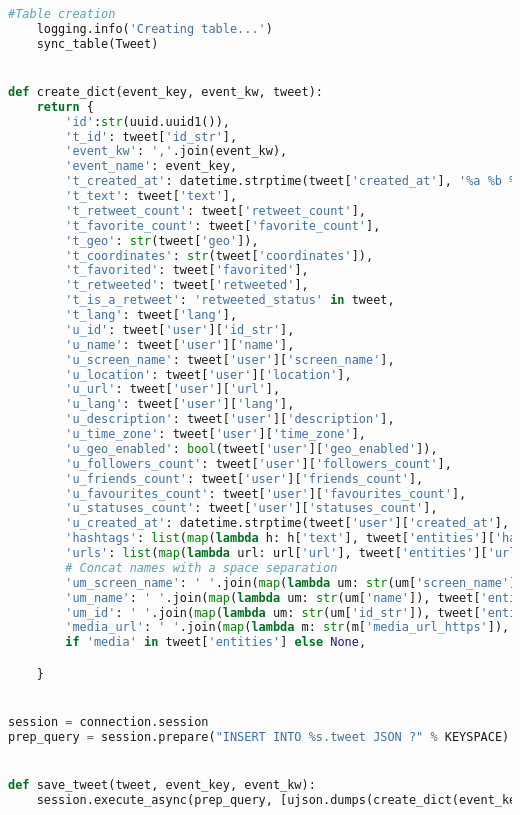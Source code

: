 \begin{lstlisting}[language=Python]
    #Table creation
    logging.info('Creating table...')
    sync_table(Tweet)


def create_dict(event_key, event_kw, tweet):
    return {
        'id':str(uuid.uuid1()),
        't_id': tweet['id_str'],
        'event_kw': ','.join(event_kw),
        'event_name': event_key,
        't_created_at': datetime.strptime(tweet['created_at'], '%a %b %d %H:%M:%S +0000 %Y').isoformat(),
        't_text': tweet['text'],
        't_retweet_count': tweet['retweet_count'],
        't_favorite_count': tweet['favorite_count'],
        't_geo': str(tweet['geo']),
        't_coordinates': str(tweet['coordinates']),
        't_favorited': tweet['favorited'],
        't_retweeted': tweet['retweeted'],
        't_is_a_retweet': 'retweeted_status' in tweet,
        't_lang': tweet['lang'],
        'u_id': tweet['user']['id_str'],
        'u_name': tweet['user']['name'],
        'u_screen_name': tweet['user']['screen_name'],
        'u_location': tweet['user']['location'],
        'u_url': tweet['user']['url'],
        'u_lang': tweet['user']['lang'],
        'u_description': tweet['user']['description'],
        'u_time_zone': tweet['user']['time_zone'],
        'u_geo_enabled': bool(tweet['user']['geo_enabled']),
        'u_followers_count': tweet['user']['followers_count'],
        'u_friends_count': tweet['user']['friends_count'],
        'u_favourites_count': tweet['user']['favourites_count'],
        'u_statuses_count': tweet['user']['statuses_count'],
        'u_created_at': datetime.strptime(tweet['user']['created_at'], '%a %b %d %H:%M:%S +0000 %Y').isoformat(),
        'hashtags': list(map(lambda h: h['text'], tweet['entities']['hashtags'])),
        'urls': list(map(lambda url: url['url'], tweet['entities']['urls'])),
        # Concat names with a space separation
        'um_screen_name': ' '.join(map(lambda um: str(um['screen_name']), tweet['entities']['user_mentions'])),
        'um_name': ' '.join(map(lambda um: str(um['name']), tweet['entities']['user_mentions'])),
        'um_id': ' '.join(map(lambda um: str(um['id_str']), tweet['entities']['user_mentions'])),
        'media_url': ' '.join(map(lambda m: str(m['media_url_https']), tweet['entities']['media']))
        if 'media' in tweet['entities'] else None,

    }


session = connection.session
prep_query = session.prepare("INSERT INTO %s.tweet JSON ?" % KEYSPACE)


def save_tweet(tweet, event_key, event_kw):
    session.execute_async(prep_query, [ujson.dumps(create_dict(event_key, event_kw, tweet)), ])
\end{lstlisting}

